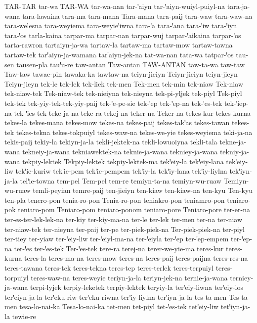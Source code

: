 {TAR-TAR
tar-wa
TAR-WA
tar-wa-nan
tar-ꞌaiyn
tar-ꞌaiyn-wuiyl-puiyl-na
tara-ja-wana
tara-lawaina
tara-ma
tara-mana
Tara-mana
tara-paij
tara-waw
tara-waw-na
tara-welesna
tara-weyiema
tara-weyieꞌiwna
tara-ꞌa
tara-ꞌana
tara-ꞌiw
tara-ꞌiyn
tara-ꞌos
tarla-kaina
tarpar-ma
tarpar-nan
tarpar-wuj
tarpar-ꞌaikaina
tarpar-ꞌos
tarta-rawron
tartaiyn-ja-wa
tartaw-la
tartaw-ma
tartaw-mow
tartaw-tawna
tartaw-tek
tarꞌaiyn-ja-wamana
tarꞌaiyn-jek-na
tat-wa-nan
tata-wa
tatpar-ꞌos
tau-sen
tausen-pla
tauꞌu-re
taw-antan
Taw-antan
TAW-ANTAN
taw-ta-wa
taw-taw
Taw-taw
tawae-pin
tawaka-ka
tawtaw-na
teiyn-jieiyn
Teiyn-jieiyn
teiyn-jieyn
Teiyn-jieyn
tek-le
tek-lek
tek-liek
tek-men
Tek-men
tek-min
tek-niaw
Tek-niaw
tek-niaw-tek
Tek-niaw-tek
tek-nieiyna
tek-nieyna
tek-pi-yljek
tek-piyl
Tek-piyl
tek-tek
tek-yiy-tek-tek-yiy-paij
tek-ꞌe-pe-sie
tek-ꞌep
tek-ꞌep-na
tek-ꞌes-tek
tek-ꞌiep-na
tek-ꞌies-tek
teke-ja-na
teke-ra
tekej-na
teker-na
Teker-na
tekes-kur
tekes-kurna
tekes-la
tekes-mana
tekes-mow
tekes-na
tekes-paij
tekes-takꞌas
tekes-tawan
tekes-tek
tekes-tekna
tekes-tokpuiyl
tekes-waw-na
tekes-we-yie
tekes-weyiema
teki-ja-na
tekis-paij
tekiy-la
tekiyn-ja-la
tekli-jektek-na
tekli-lowuoiyna
tekli-tala
tekne-ja-wana
tekneiy-ja-wana
tekniawektek-na
teknie-ja-wana
tekniey-ja-wana
tekniy-ja-wana
tekpiy-lektek
Tekpiy-lektek
tekpiy-lektek-ma
tekꞌeiy-la
tekꞌeiy-lana
tekꞌeiy-liw
tekꞌie-kuriw
tekꞌie-pem
tekꞌie-pempem
tekꞌiy-la
tekꞌiy-lana
tekꞌiy-liylna
tekꞌiyn-ja-la
telꞌie-towna
tem-pel
Tem-pel
tem-re
temiyn-ta-na
temiyn-wu-ruaw
Temiyn-wu-ruaw
temli-peyian
temre-paij
ten-jieiyn
ten-kiaw
ten-kiaw-na
ten-kyu
Ten-kyu
ten-pla
tenero-pon
tenia-ro-pon
Tenia-ro-pon
teniakro-pon
teniamro-pon
teniaro-pok
teniaro-pom
Teniaro-pom
teniaro-ponom
teniaro-pore
Teniaro-pore
ter-er-na
ter-es-ter-lek-lek-na
ter-kiy
ter-kiy-ma-na
ter-le
ter-lek
ter-men
ter-na
ter-niaw
ter-niaw-tek
ter-nieyna
ter-paij
ter-pe
ter-piek-piek-na
Ter-piek-piek-na
ter-piyl
ter-tiey
ter-yiaw
ter-ꞌeiy-liw
ter-ꞌeiyl-ma-na
ter-ꞌeiyla
ter-ꞌep
ter-ꞌep-empem
ter-ꞌep-na
ter-ꞌes
ter-ꞌes-tek
Ter-ꞌes-tek
tere-ra
terej-na
terer-we-yie-ma
teres-kur
teres-kurna
teres-la
teres-ma-na
teres-mow
teres-na
teres-paij
teres-paijna
teres-res-na
teres-tawana
teres-tek
teres-tekna
teres-tep
teres-terlek
teres-terpuiyl
teres-torpuiyl
teres-waw-na
teres-weyie
teriyn-ja-la
teriyn-jek-na
ternie-ja-wana
terniey-ja-wana
terpi-lyjek
terpiy-leketek
terpiy-lektek
teryiy-la
terꞌeiy-liwna
terꞌeiy-los
terꞌeiyn-ja-la
terꞌeku-riw
terꞌeku-riwna
terꞌiy-liylna
terꞌiyn-ja-la
tes-ta-men
Tes-ta-men
tesa-lo-nai-ka
Tesa-lo-nai-ka
tet-men
tet-piyl
tet-ꞌes-tek
tetꞌeiy-liw
tetꞌiyn-ja-la
tewie-re
}
